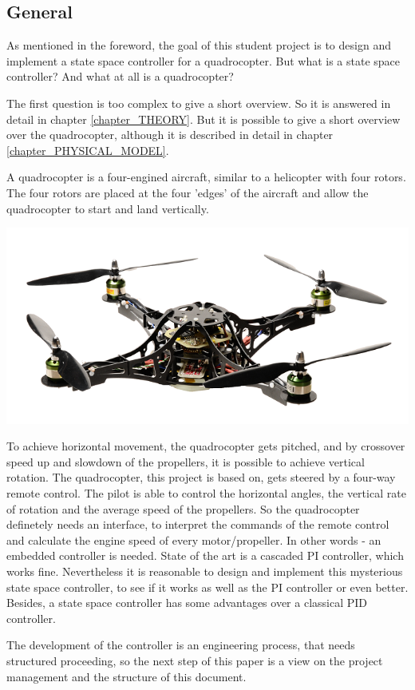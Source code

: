 \subsection{General}\label{chapter_GENERAL}

As mentioned in the foreword, the goal of this student project is to design and implement a state space controller for a quadrocopter. But what is a state space controller? And what at all is a quadrocopter?

The first question is too complex to give a short overview. So it is answered in detail in chapter \ref{chapter_THEORY}.
But it is possible to give a short overview over the quadrocopter, although it is described in detail in chapter \ref{chapter_PHYSICAL_MODEL}.

A quadrocopter is a four-engined aircraft, similar to a helicopter with four rotors. The four rotors are placed at the four 'edges' of the aircraft and allow the quadrocopter to start and land vertically. 

\begin{center}
	\includegraphics[width=1.00\textwidth]{03_Grafiken/QuadrocopterImage.png}
\end{center}

To achieve horizontal movement, the quadrocopter gets pitched, and by crossover speed up and slowdown of the propellers, it is possible to achieve vertical rotation.
The quadrocopter, this project is based on, gets steered by a four-way remote control. The pilot is able to control the horizontal angles, the vertical rate of rotation and the average speed of the propellers. So the quadrocopter definetely needs an interface, to interpret the commands of the remote control and calculate the engine speed of every motor/propeller. In other words - an embedded controller is needed.
State of the art is a cascaded PI controller, which works fine. Nevertheless it is reasonable to design and implement this mysterious state space controller, to see if it works as well as the PI controller or even better. Besides, a state space controller has some advantages over a classical PID controller.

The development of the controller is an engineering process, that needs structured proceeding, so the next step of this paper is a view on the project management and the structure of this document.